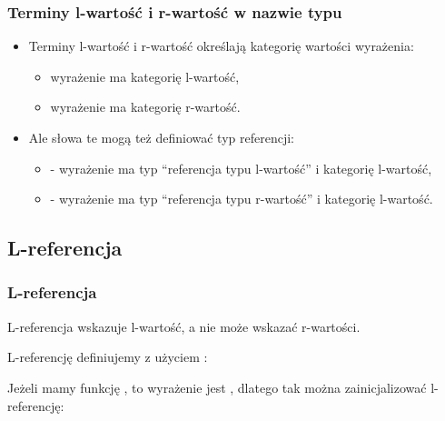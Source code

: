 \documentclass[compress]{beamer}
\begin{document}
\begin{frame}

  \frametitle{Terminy l-wartość i r-wartość w nazwie typu}

  \begin{itemize}

  \item Terminy l-wartość i r-wartość określają kategorię wartości
    wyrażenia:

    \begin{itemize}

    \item wyrażenie  ma kategorię l-wartość,

    \item wyrażenie  ma kategorię r-wartość.

    \end{itemize}

  \item Ale słowa te mogą też definiować typ referencji:

    \begin{itemize}

    \item {} - wyrażenie  ma typ ``referencja typu
      l-wartość'' i kategorię l-wartość,

    \item {} - wyrażenie  ma typ ``referencja
      typu r-wartość'' i kategorię l-wartość.

    \end{itemize}

  \end{itemize}

  \vspace{0.5 cm}
  
  
\end{frame}


\subsection{L-referencja}

\begin{frame}

  \frametitle{L-referencja}

  L-referencja wskazuje l-wartość, a nie może wskazać r-wartości.

  \vspace{0.5 cm}
  
  L-referencję definiujemy z użyciem \code{&}: 

  \vspace{0.5 cm}

  Jeżeli mamy funkcję , to wyrażenie 
  jest , dlatego tak można zainicjalizować
  l-referencję: 

\end{frame}
\end{document}
